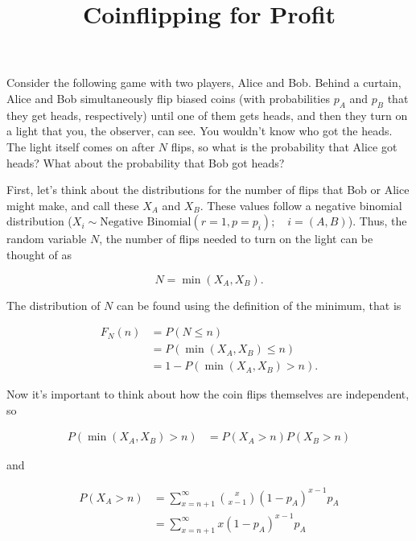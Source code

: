 \documentclass{article}
\title{Coinflipping for Profit}
\begin{document}
	\maketitle
	
	Consider the following game with two players, Alice and Bob. Behind a curtain, Alice and Bob simultaneously flip biased coins (with probabilities $p_A$ and $p_B$ that they get heads, respectively) until one of them gets heads, and then they turn on a  light that you, the observer, can see. You wouldn't know who got the heads. The light itself comes on after $N$ flips, so what is the probability that Alice got heads? What about the probability that Bob got heads?
	
	First, let's think about the distributions for the number of flips that Bob or Alice might make, and call these $X_A$ and $X_B$. These values follow a negative binomial distribution ($X_i \sim \text{Negative Binomial}(r = 1, p = p_i); \quad i = (A,B)$). Thus, the random variable $N$, the number of flips needed to turn on the light can be thought of as
	
	$$ N = \min\left(X_A, X_B\right). $$
	
	The distribution of $N$ can be found using the definition of the minimum, that is
	
	\begin{align*}
		F_N(n) & = P(N \leq n) \\
		& = P(\min(X_A,X_B) \leq n) \\
		& = 1 - P(\min(X_A,X_B) > n).
	\end{align*}

	Now it's important to think about how the coin flips themselves are independent, so
	
	\begin{align*}
		P(\min(X_A,X_B) > n) & = P(X_A > n) P(X_B > n)
	\end{align*}

	and 
	
	\begin{align*}
		P(X_A > n) & = \sum_{x = n+1}^\infty \binom{x}{x - 1} (1 - p_A)^{x - 1} p_A \\
		& =  \sum_{x = n+1}^\infty x (1 - p_A)^{x - 1} p_A
	\end{align*}
	
\end{document}
